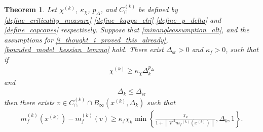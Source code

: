 \documentclass{article}
\newtheorem{theorem}{Theorem}[section]
\theoremstyle{case}
\numberwithin{theorem}{subsection}
\newcommand{\capcones}{{C^{(k)}_{\cap}}}
\newcommand{\chik}{{\chi^{(k)}}}
\newcommand{\dk}{\Delta_k}
\newcommand{\dsr}{{\Delta_{\textrm{sr}}}}
\newcommand{\mfk}{{{m}_f}^{(k)}}
\newcommand{\tr}{{ B_{\infty}\left(\xk, \dk\right) }}
\newcommand{\xk}{x^{(k)}}
\begin{document}
\begin{theorem}
\label{sufficient_reduction_theorem}
Let 
$\chik$,
$\kappa_{\chi}$,
$p_{\Delta}$,
and $\capcones$
be defined by
\cref{define_criticality_measure}
\cref{define_kappa_chi}
\cref{define_p_delta}
and \cref{define_capcones}
respectively.
Suppose that
\cref{minangleassumption_alt},
and the assumptions for
\cref{i_thought_i_proved_this_already},
\cref{bounded_model_hessian_lemma}
hold.
There exist $\dsr>0$ and $\kappa_f > 0$, such that if
\begin{align}
\chik \ge \kappa_{\chi} \dk^{p_{\Delta}} \label{sr_chi_big_enough}
\end{align}
and
\begin{align}
\dk \le \dsr \label{sr_delta_small_enough}
\end{align}
then there exists $v \in \capcones \cap \tr$ such that
\begin{align*}
m_f^{(k)}(\xk) - m_f^{(k)}(v)
\ge \kappa_f \chi_k \min\left\{ \frac{\chi_k}{1+\left\|\nabla^2 \mfk(\xk)\right\|}, \dk, 1 \right\}.
\end{align*}

\end{theorem}
\end{document}
